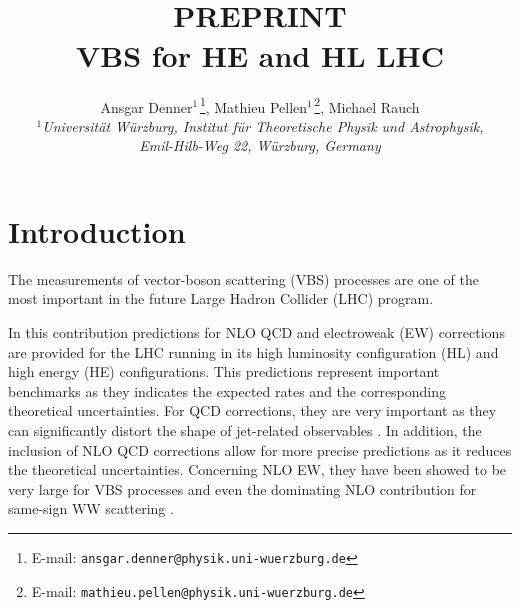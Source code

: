 \documentclass[11pt,epsf]{article}
\newcommand{\MP}[1]{{ {\color{blue}{ [MP: #1]}} }}
\begin{document}
\title{\hfill ~\\[-30mm]
\phantom{h} \hfill\mbox{\small PREPRINT}
\\[1cm]
\vspace{13mm}   \textbf{VBS for HE and HL LHC}}

\date{}
\author{
Ansgar Denner$^{1\,}$\footnote{E-mail:
  \texttt{ansgar.denner@physik.uni-wuerzburg.de}},
Mathieu Pellen$^{1\,}$\footnote{E-mail:
  \texttt{mathieu.pellen@physik.uni-wuerzburg.de}},
Michael Rauch
\\[9mm]
{\small\it
$^1$Universit\"at W\"urzburg, %
        Institut f\"ur Theoretische Physik und Astrophysik,} \\ %
{\small\it Emil-Hilb-Weg 22,  W\"urzburg, %
        Germany}\\[3mm]
}

\maketitle

\begin{abstract}
\noindent

\end{abstract}
\thispagestyle{empty}
\vfill
\newpage
\setcounter{page}{1}

\tableofcontents
\newpage


\section{Introduction}

The measurements of vector-boson scattering (VBS) processes are one of the most important in the future Large Hadron Collider (LHC) program.

In this contribution predictions for NLO QCD and electroweak (EW) corrections are provided for the LHC running in its high luminosity configuration (HL) and high energy (HE) configurations.
This predictions represent important benchmarks as they indicates the expected rates and the corresponding theoretical uncertainties.
For QCD corrections, they are very important as they can significantly distort the shape of jet-related observables \cite{Jager:2006zc,Jager:2006cp,Bozzi:2007ur,Jager:2009xx,Jager:2011ms,Denner:2012dz,Rauch:2016pai} \MP{More?}.
In addition, the inclusion of NLO QCD corrections allow for more precise predictions as it reduces the theoretical uncertainties.
Concerning NLO EW, they have been showed to be very large for VBS processes \cite{Biedermann:2016yds} and even the dominating NLO contribution for same-sign WW scattering \cite{Biedermann:2017bss}.
\end{document}
